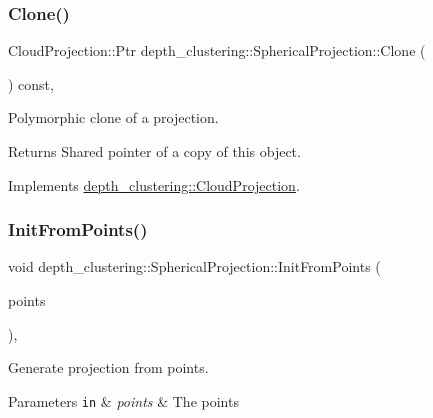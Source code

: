 \subsubsection{\texorpdfstring{Clone()}{Clone()}}
{\footnotesize\ttfamily Cloud\+Projection\+::\+Ptr depth\+\_\+clustering\+::\+Spherical\+Projection\+::\+Clone (\begin{DoxyParamCaption}{ }\end{DoxyParamCaption}) const\hspace{0.3cm}{\ttfamily [override]}, {\ttfamily [virtual]}}



Polymorphic clone of a projection. 

\begin{DoxyReturn}{Returns}
Shared pointer of a copy of this object. 
\end{DoxyReturn}


Implements \hyperlink{classdepth__clustering_1_1CloudProjection_ae06ff9699c1a37c535b39fa6f722fa2e}{depth\+\_\+clustering\+::\+Cloud\+Projection}.

\mbox{\label{classdepth__clustering_1_1SphericalProjection_ab80cb1d72f60e7a887affa0ab10ebc03}} 
\subsubsection{\texorpdfstring{Init\+From\+Points()}{InitFromPoints()}}
{\footnotesize\ttfamily void depth\+\_\+clustering\+::\+Spherical\+Projection\+::\+Init\+From\+Points (\begin{DoxyParamCaption}\item[{const Rich\+Point\+::\+Aligned\+Vector \&}]{points }\end{DoxyParamCaption})\hspace{0.3cm}{\ttfamily [override]}, {\ttfamily [virtual]}}



Generate projection from points. 


\begin{DoxyParams}[1]{Parameters}
\mbox{\tt in}  & {\em points} & The points \\
\hline
\end{DoxyParams}



